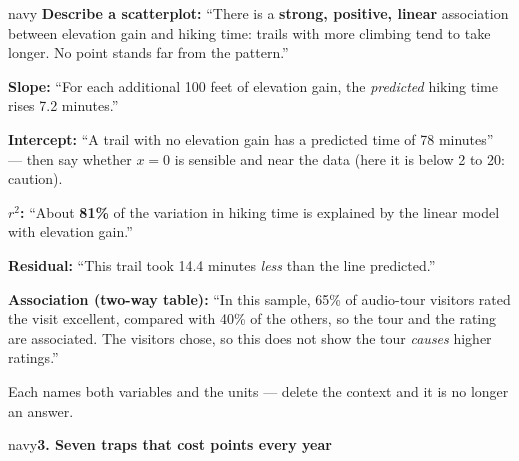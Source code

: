 \documentclass[12pt]{article}
\newcommand{\sghead}[2][10]{%
  \vspace{0.13in}
  \boxguard[#1]
  \begin{headlinebox}{navy}\color{white}\bfseries\small #2\end{headlinebox}
  \vspace{0.09in}}
\begin{document}
\vspace{0.10in}
\boxguard[20]
\begin{scenariobox}{navy}
\small
\textbf{Describe a scatterplot:} ``There is a \textbf{strong, positive, linear} association
between elevation gain and hiking time: trails with more climbing tend to take longer. No
point stands far from the pattern.''\par\vspace{2pt}
\textbf{Slope:} ``For each additional 100 feet of elevation gain, the \emph{predicted} hiking
time rises 7.2 minutes.''\par\vspace{3pt}
\textbf{Intercept:} ``A trail with no elevation gain has a predicted time of 78 minutes'' ---
then say whether $x = 0$ is sensible and near the data (here it is below 2 to 20: caution).\par\vspace{3pt}
\textbf{$r^2$:} ``About \textbf{81\%} of the variation in hiking time is explained by the
linear model with elevation gain.''\par\vspace{3pt}
\textbf{Residual:} ``This trail took 14.4 minutes \emph{less} than the line predicted.''
\par\vspace{3pt}
\textbf{Association (two-way table):} ``In this sample, 65\% of audio-tour visitors rated the
visit excellent, compared with 40\% of the others, so the tour and the rating are associated.
The visitors chose, so this does not show the tour \emph{causes} higher ratings.''
\par\vspace{3pt}
Each names both variables and the units --- delete the context and it is no longer an answer.
\end{scenariobox}

\sghead{3. Seven traps that cost points every year}
\end{document}
